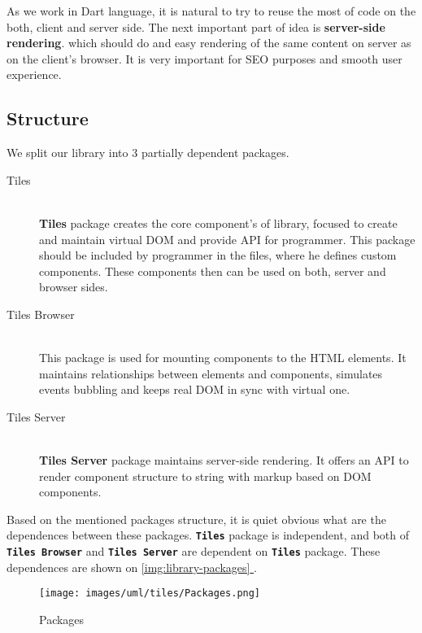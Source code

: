 \documentclass[oneside, 12pt]{book}
\newcommand*{\fullref}[1]{\hyperref[{#1}]{\autoref*{#1} \nameref*{#1}}}
\begin{document}
    As we work in Dart language, it is natural to try to reuse the most of code on the both, client and server side.
    The next important part of idea is \textbf{server-side rendering}.
    which should do and easy rendering of the same content on server as on the client's browser.
    It is very important for SEO purposes and smooth user experience. 

  \subsection{Structure}\label{subsec:our-architecture-structure}

    We split our library into 3 partially dependent packages. 
    \begin{description}
      \item[Tiles] \hfill \\
        \textbf{Tiles} package creates the core component's of library, focused to create and maintain virtual DOM and provide API for programmer.
        This package should be included by programmer in the files, where he defines custom components. 
        These components then can be used on both, server and browser sides.
      \item[Tiles Browser] \hfill \\
        This package is used for mounting components to the HTML elements. 
        It maintains relationships between elements and components, 
        simulates events bubbling and keeps real DOM in sync with virtual one.
      \item[Tiles Server] \hfill \\
        \textbf{Tiles Server} package maintains server-side rendering. It offers an API to render component structure to string with markup based on DOM components.
    \end{description}

    Based on the mentioned packages structure, it is quiet obvious what are the dependences between these packages.
    \texttt{\textbf{Tiles}} package is independent, 
		and both of \texttt{\textbf{Tiles Browser}} and \texttt{\textbf{Tiles Server}} are dependent on \texttt{\textbf{Tiles}} package.
    These dependences are shown on \fullref{img:library-packages}.

    \begin{figure}[h]
    \centering  
      \texttt{[image: images/uml/tiles/Packages.png]}
      \caption{Packages}
      \label{img:library-packages}
    \end{figure}
\end{document}
